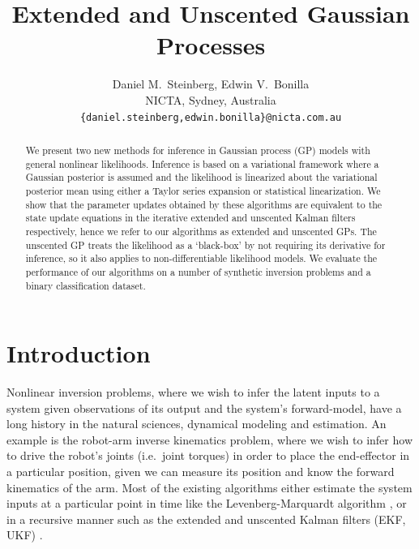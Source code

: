 \documentclass{article} %
\title{Extended and Unscented Gaussian Processes}
\author{
    Daniel M.~Steinberg, Edwin V.~Bonilla \\
    NICTA, 
    Sydney, Australia\\
    \texttt{\{daniel.steinberg,edwin.bonilla\}@nicta.com.au}
}
\begin{document}
\maketitle

\begin{abstract}

    We present two new methods for inference in Gaussian process (GP) models
    with general nonlinear likelihoods. Inference is based on a variational
    framework where a Gaussian posterior is assumed and the likelihood is
    linearized about the variational posterior mean using either a %
    Taylor series expansion or statistical linearization. We show that the
    parameter updates obtained by these algorithms are equivalent to the state
    update equations in the iterative extended and unscented Kalman filters
    respectively, hence we refer to our algorithms as extended and unscented
    GPs. The unscented GP treats the likelihood as a `black-box' by not
    requiring its derivative for inference, so it also applies to
    non-differentiable likelihood models. We evaluate the performance of our
    algorithms on a  number of synthetic inversion problems and a binary
    classification dataset.
    
\end{abstract}


\section{Introduction}

Nonlinear inversion problems, where we wish to infer the latent inputs to a
system given observations of its output and the system's forward-model, have a
long history in the natural sciences, dynamical modeling and estimation. An
example is the robot-arm inverse kinematics problem, where we wish to infer how
to drive the robot's joints (i.e.~joint torques) in order to place the
end-effector in a particular position, given we can measure its position and
know the forward kinematics of the arm. Most of the existing algorithms either
estimate the system inputs at a particular point in time like the
Levenberg-Marquardt algorithm \cite{Marquardt1963}, or in a recursive manner
such as the extended and unscented Kalman filters (EKF, UKF) \cite{Julier2004}. 
\end{document}
